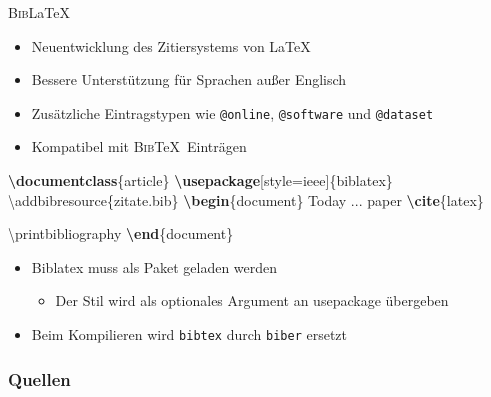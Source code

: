 \documentclass[aspectratio=169]{beamer}
\providecommand{\tightlist}{\setlength{\itemsep}{0pt}\setlength{\parskip}{0pt}}
\newenvironment{Shaded}{\begin{snugshade}}{\end{snugshade}}
\newcommand{\BuiltInTok}[1]{\textcolor[rgb]{0.25,0.67,0.19}{\textbf{#1}}}
\newcommand{\ExtensionTok}[1]{\textcolor[rgb]{0.25,0.67,0.19}{#1}}
\newcommand{\FunctionTok}[1]{\textcolor[rgb]{0.34,0.51,0.35}{#1}}
\newcommand{\KeywordTok}[1]{\textcolor[rgb]{0.25,0.67,0.19}{\textbf{#1}}}
\newcommand{\NormalTok}[1]{\textcolor[rgb]{0.19,0.19,0.19}{#1}}
\newenvironment{Shaded}{}{}
\newcommand\citestyle[1]{\textcolor{foreground-secondary}{\textsuperscript{#1}}}
\let\oldautocite\autocite
\renewcommand{\autocite}[1]{\citestyle{\oldautocite{#1}}}
\begin{document}
    \begin{frame}[fragile]{\textsc{Bib}\LaTeX}
    \protect\hypertarget{section-2}{}
    \begin{itemize}
    \tightlist
    \item
      Neuentwicklung des Zitiersystems von
      \LaTeX \autocite{ctan-biblatex}
    \item
      Bessere Unterstützung für Sprachen außer Englisch
      \autocite{ctan-biblatex}
    \item
      Zusätzliche Eintragstypen wie \texttt{@online}, \texttt{@software}
      und \texttt{@dataset} \autocite{biblatex}
    \item
      Kompatibel mit \textsc{Bib}\TeX~Einträgen \autocite{biblatex}
    \end{itemize}

    \begin{minipage}{0.66\textwidth}

\begin{Shaded}
\begin{Highlighting}[]
\BuiltInTok{\textbackslash{}documentclass}\NormalTok{\{}\ExtensionTok{article}\NormalTok{\}}
\BuiltInTok{\textbackslash{}usepackage}\NormalTok{[style=ieee]\{}\ExtensionTok{biblatex}\NormalTok{\}}
\FunctionTok{\textbackslash{}addbibresource}\NormalTok{\{zitate.bib\}}
\KeywordTok{\textbackslash{}begin}\NormalTok{\{}\ExtensionTok{document}\NormalTok{\}}
\NormalTok{\textasciigrave{}\textasciigrave{}Today ... paper\textquotesingle{}\textquotesingle{} }
\KeywordTok{\textbackslash{}cite}\NormalTok{\{}\ExtensionTok{latex}\NormalTok{\}}

\FunctionTok{\textbackslash{}printbibliography}
\KeywordTok{\textbackslash{}end}\NormalTok{\{}\ExtensionTok{document}\NormalTok{\}}
\end{Highlighting}
\end{Shaded}

    \end{minipage}\begin{minipage}{0.33\textwidth}

    \begin{itemize}
    \tightlist
    \item
      Biblatex muss als Paket geladen werden \autocite{biblatex}

      \begin{itemize}
      \tightlist
      \item
        Der Stil wird als optionales Argument an usepackage übergeben
      \end{itemize}
    \item
      Beim Kompilieren wird \texttt{bibtex} durch \texttt{biber} ersetzt
      \autocite{biblatex}
    \end{itemize}

    \end{minipage}
    \end{frame}

        \begin{frame}[allowframebreaks]
            \frametitle{Quellen}
            \printbibliography[heading=none]
    \end{frame}
    
    
\end{document}
